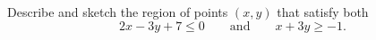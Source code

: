 Describe and sketch the region of points $(x,y)$ that satisfy both
\[
2x-3y+7\le0\qquad\text{and}\qquad x+3y\ge-1 .
\]
